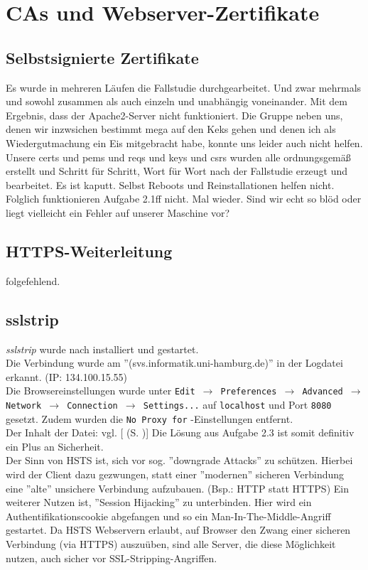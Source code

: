 \documentclass[twoside]{article}
\newcommand{\say}[1]{%
	''#1''%
}
\newcommand{\ttt}[1]{%
	\texttt{#1}%
}
\newcommand{\mref}[1]{[\nameref{#1} (S. \pageref{#1})]}
\begin{document}
\section{CAs und Webserver-Zertifikate}
	\label{sec:zertifikate}
	\subsection{Selbstsignierte Zertifikate}
		\label{ssec:self-signed}
		Es wurde in mehreren Läufen die Fallstudie durchgearbeitet.
		Und zwar mehrmals und sowohl zusammen als auch einzeln und unabhängig voneinander.
		Mit dem Ergebnis, dass der Apache2-Server nicht funktioniert.
		Die Gruppe neben uns, denen wir inzwsichen bestimmt mega auf den Keks gehen und denen ich als Wiedergutmachung ein Eis mitgebracht habe, konnte uns leider auch nicht helfen.
		Unsere certs und pems und reqs und keys und csrs wurden alle ordnungsgemäß erstellt und Schritt für Schritt, Wort für Wort nach der Fallstudie erzeugt und bearbeitet.
		Es ist kaputt.
		Selbst Reboots und Reinstallationen helfen nicht.
		Folglich funktionieren Aufgabe 2.1ff nicht.
		Mal wieder.
		Sind wir echt so blöd oder liegt vielleicht ein Fehler auf unserer Maschine vor?
	\subsection{HTTPS-Weiterleitung}
		\label{ssec:https}
		folgefehlend.
	\subsection{sslstrip}
		\label{ssec:sslstrip}
		\textit{sslstrip} wurde nach \cite{sslstrip} installiert und gestartet.\\
		Die Verbindung wurde am \say{(svs.informatik.uni-hamburg.de)} in der Logdatei erkannt. (IP: 134.100.15.55)\\
		Die Browsereinstellungen wurde unter \ttt{Edit $\rightarrow$ Preferences $\rightarrow$ Advanced $\rightarrow$ Network $\rightarrow$ Connection $\rightarrow$ Settings...} auf \ttt{localhost} und Port \ttt{8080} gesetzt.
		Zudem wurden die \ttt{No Proxy for}-Einstellungen entfernt.\\
		Der Inhalt der Datei: vgl. \mref{ssllog}
		Die Lösung aus Aufgabe 2.3 ist somit definitiv ein Plus an Sicherheit.\\
		Der Sinn von HSTS ist, sich vor sog. \say{downgrade Attacks} zu schützen.
		Hierbei wird der Client dazu gezwungen, statt einer \say{modernen} sicheren Verbindung eine \say{alte} unsichere Verbindung aufzubauen. (Bsp.: HTTP statt HTTPS)
		Ein weiterer Nutzen ist, \say{Session Hijacking} zu unterbinden.
		Hier wird ein Authentifikationscookie abgefangen und so ein Man-In-The-Middle-Angriff gestartet.
		Da HSTS Webservern erlaubt, auf Browser den Zwang einer sicheren Verbindung (via HTTPS) auszuüben, sind alle Server, die diese Möglichkeit nutzen, auch sicher vor SSL-Stripping-Angriffen.
		
\end{document}
